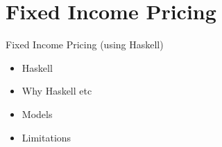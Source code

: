 \chapter{Fixed Income Pricing}
Fixed Income Pricing (using Haskell)
\begin{itemize}
\item Haskell
\item Why Haskell etc
\item Models
\item Limitations
\end{itemize}

